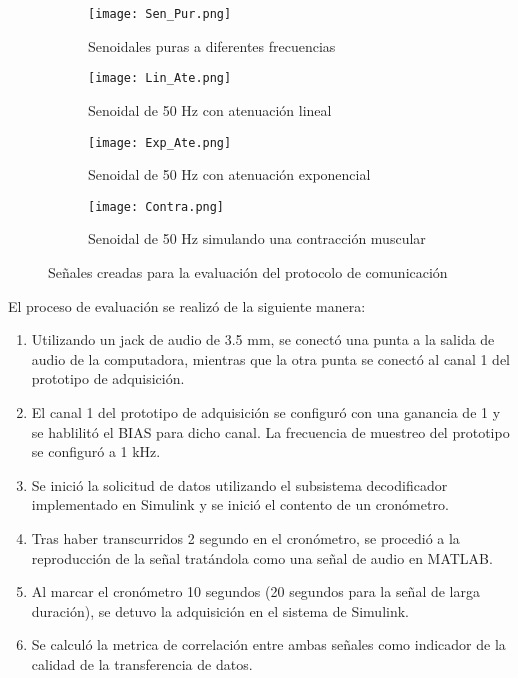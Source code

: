 \begin{figure}[htbp]
	\centering
	\begin{subfigure}[htbp]{0.4\textwidth}
		\texttt{[image: Sen\_Pur.png]}
		\caption{Senoidales puras a diferentes frecuencias}
		\label{Figura: SenPur}
	\end{subfigure}
	\hfill
	\begin{subfigure}[htbp]{0.4\textwidth}
		\texttt{[image: Lin\_Ate.png]}
		\caption{Senoidal de 50 Hz con atenuación lineal}
		\label{Figura: LinAte}
	\end{subfigure}
	\hfill
	\begin{subfigure}[htbp]{0.4\textwidth}
		\texttt{[image: Exp\_Ate.png]}
		\caption{Senoidal de 50 Hz con atenuación exponencial}
		\label{Figura: ExpAte}
	\end{subfigure}
	\hfill
	\begin{subfigure}[htbp]{0.4\textwidth}
		\texttt{[image: Contra.png]}
		\caption{Senoidal de 50 Hz simulando una contracción muscular}
		\label{Figura: Contra}
	\end{subfigure}	
	\caption{Señales creadas para la evaluación del protocolo de comunicación}
	\label{Figura: SenalesEva}
\end{figure}

El proceso de evaluación se realizó de la siguiente manera:
\begin{enumerate}
	\item Utilizando un jack de audio de 3.5 mm, se conectó una punta a la salida de audio de la computadora, mientras que la otra punta se conectó al canal 1 del prototipo de adquisición.
	\item El canal 1 del prototipo de adquisición se configuró con una ganancia de 1 y se hablilitó el BIAS para dicho canal. La frecuencia de muestreo del prototipo se configuró a 1 kHz.
	\item Se inició la solicitud de datos utilizando el subsistema decodificador implementado en Simulink y se inició el contento de un cronómetro.
	\item Tras haber transcurridos 2 segundo en el cronómetro, se procedió a la reproducción de la señal tratándola como una señal de audio en MATLAB.
	\item Al marcar el cronómetro 10 segundos (20 segundos para la señal de larga duración), se detuvo la adquisición en el sistema de Simulink.
	\item Se calculó la metrica de correlación entre ambas señales como indicador de la calidad de la transferencia de datos.
\end{enumerate}

